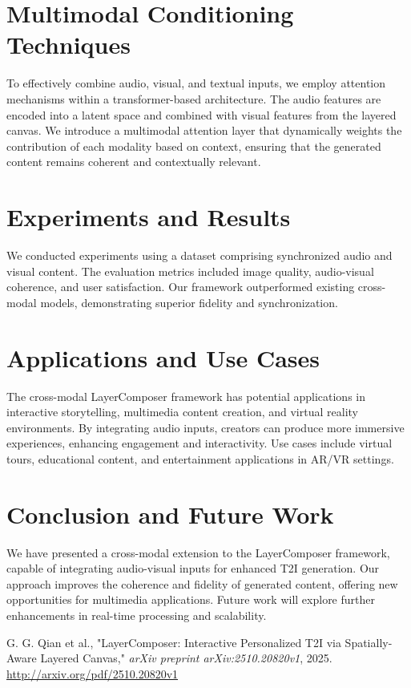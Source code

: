 \documentclass{article}
\begin{document}
\section{Multimodal Conditioning Techniques}
To effectively combine audio, visual, and textual inputs, we employ attention mechanisms within a transformer-based architecture. The audio features are encoded into a latent space and combined with visual features from the layered canvas. We introduce a multimodal attention layer that dynamically weights the contribution of each modality based on context, ensuring that the generated content remains coherent and contextually relevant.

\section{Experiments and Results}
We conducted experiments using a dataset comprising synchronized audio and visual content. The evaluation metrics included image quality, audio-visual coherence, and user satisfaction. Our framework outperformed existing cross-modal models, demonstrating superior fidelity and synchronization.

\section{Applications and Use Cases}
The cross-modal LayerComposer framework has potential applications in interactive storytelling, multimedia content creation, and virtual reality environments. By integrating audio inputs, creators can produce more immersive experiences, enhancing engagement and interactivity. Use cases include virtual tours, educational content, and entertainment applications in AR/VR settings.

\section{Conclusion and Future Work}
We have presented a cross-modal extension to the LayerComposer framework, capable of integrating audio-visual inputs for enhanced T2I generation. Our approach improves the coherence and fidelity of generated content, offering new opportunities for multimedia applications. Future work will explore further enhancements in real-time processing and scalability.


\begin{thebibliography}{9}
G. G. Qian et al., "LayerComposer: Interactive Personalized T2I via Spatially-Aware Layered Canvas," \textit{arXiv preprint arXiv:2510.20820v1}, 2025. \url{http://arxiv.org/pdf/2510.20820v1}
\end{thebibliography}
\end{document}
